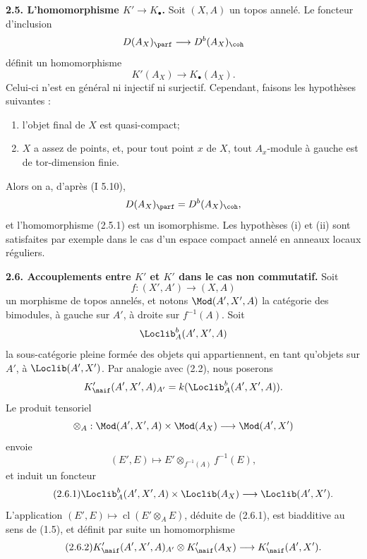 \documentclass[11pt]{article}
\newcommand{\cl}{\operatorname{cl}}
\begin{document}
\textbf{2.5. L'homomorphisme \(K'\to K_{\bullet}\).} Soit \((X,A)\) un topos annelé. Le foncteur d'inclusion
\[
 D(A_X)_{\parf}\longrightarrow D^b(A_X)_{\coh}
\]
définit un homomorphisme
\begin{equation}\tag{2.5.1}
 K'(A_X)\longrightarrow K_{\bullet}(A_X).
\end{equation}
Celui-ci n'est en général ni injectif ni surjectif. Cependant, faisons les hypothèses suivantes :
\begin{enumerate}[label=(\roman*)]
\item l'objet final de \(X\) est quasi-compact;
\item \(X\) a assez de points, et, pour tout point \(x\) de \(X\), tout \(A_x\)-module à gauche est de tor-dimension finie.
\end{enumerate}
Alors on a, d'après (I 5.10),
\[
 D(A_X)_{\parf}=D^b(A_X)_{\coh},
\]
et l'homomorphisme (2.5.1) est un isomorphisme. Les hypothèses (i) et (ii) sont satisfaites par exemple dans le cas d'un espace compact annelé en anneaux locaux réguliers.

\textbf{2.6. Accouplements entre \(K'\) et \(K'\) dans le cas non commutatif.} Soit
\[
 f:(X',A')\longrightarrow (X,A)
\]
un morphisme de topos annelés, et notons \(\Mod(A',X',A)\) la catégorie des bimodules, à gauche sur \(A'\), à droite sur \(f^{-1}(A)\). Soit
\[
 \Loclib_A^b(A',X',A)
\]
la sous-catégorie pleine formée des objets qui appartiennent, en tant qu'objets sur \(A'\), à \(\Loclib(A',X')\). Par analogie avec (2.2), nous poserons
\[
 K'_{\naif}(A',X',A)_{A'}=k(\Loclib_A^b(A',X',A)).
\]
Le produit tensoriel
\[
 \otimes_A:\Mod(A',X',A)\times\Mod(A_X)\longrightarrow \Mod(A',X')
\]
envoie
\[
 (E',E)\longmapsto E'\otimes_{f^{-1}(A)}f^{-1}(E),
\]
et induit un foncteur
\begin{equation}\tag{2.6.1}
 \Loclib_A^b(A',X',A)\times\Loclib(A_X)\longrightarrow\Loclib(A',X').
\end{equation}
L'application \((E',E)\mapsto\cl(E'\otimes_A E)\), déduite de (2.6.1), est biadditive au sens de (1.5), et définit par suite un homomorphisme
\begin{equation}\tag{2.6.2}
 K'_{\naif}(A',X',A)_{A'}\otimes K'_{\naif}(A_X)\longrightarrow K'_{\naif}(A',X').
\end{equation}
\end{document}
